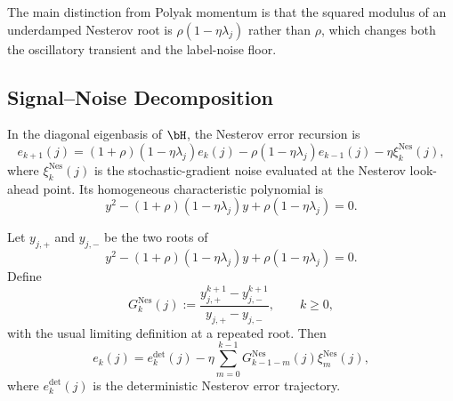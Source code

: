 The main distinction from Polyak momentum is that the squared modulus of an underdamped Nesterov root is $\rho(1-\eta\lambda_j)$ rather than $\rho$, which changes both the oscillatory transient and the label-noise floor.

\subsection{Signal--Noise Decomposition}
\label{app:nes_signal_noise_decomp}

In the diagonal eigenbasis of $\bH$, the Nesterov error recursion is
\[
    e_{k+1}(j)
    =
    (1+\rho)(1-\eta\lambda_j)e_k(j)
    -\rho(1-\eta\lambda_j)e_{k-1}(j)
    -\eta\xi_k^{\mathrm{Nes}}(j),
\]
where $\xi_k^{\mathrm{Nes}}(j)$ is the stochastic-gradient noise evaluated at the Nesterov look-ahead point. Its homogeneous characteristic polynomial is
\[
    y^2-(1+\rho)(1-\eta\lambda_j)y+\rho(1-\eta\lambda_j)=0.
\]

Let \(y_{j,+}\) and \(y_{j,-}\) be the two roots of
\[
    y^2-(1+\rho)(1-\eta\lambda_j)y+\rho(1-\eta\lambda_j)=0.
\]
Define
\[
    G_k^{\mathrm{Nes}}(j)
    :=
    \frac{y_{j,+}^{k+1}-y_{j,-}^{k+1}}{y_{j,+}-y_{j,-}},
    \qquad k\ge0,
\]
with the usual limiting definition at a repeated root.  Then
\begin{equation}
\label{eq:nes_impulse_response}
    e_k(j)
    =
    e_k^{\mathrm{det}}(j)
    -\eta\sum_{m=0}^{k-1}G_{k-1-m}^{\mathrm{Nes}}(j)\xi_m^{\mathrm{Nes}}(j),
\end{equation}
where $e_k^{\mathrm{det}}(j)$ is the deterministic Nesterov error trajectory.

